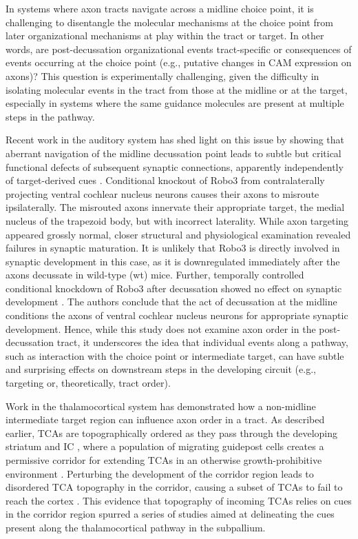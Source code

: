 In systems where axon tracts navigate across a midline choice point, it is challenging to disentangle the molecular mechanisms at the choice point from later organizational mechanisms at play within the tract or target. 
In other words, are post-decussation organizational events tract-specific or consequences of events occurring at the choice point (e.g., putative changes in CAM expression on axons)? 
This question is experimentally challenging, given the difficulty in isolating molecular events in the tract from those at the midline or at the target, especially in systems where the same guidance molecules are present at multiple steps in the pathway. 

Recent work in the auditory system has shed light on this issue by showing that aberrant navigation of the midline decussation point leads to subtle but critical functional defects of subsequent synaptic connections, apparently independently of target-derived cues \cite{michalski2013robo3}. 
Conditional knockout of Robo3 from contralaterally projecting ventral cochlear nucleus neurons causes their axons to misroute ipsilaterally. 
The misrouted axons innervate their appropriate target, the medial nucleus of the trapezoid body, but with incorrect laterality. 
While axon targeting appeared grossly normal, closer structural and physiological examination revealed failures in synaptic maturation. 
It is unlikely that Robo3 is directly involved in synaptic development in this case, as it is downregulated immediately after the axons decussate in wild-type (wt) mice. 
Further, temporally controlled conditional knockdown of Robo3 after decussation showed no effect on synaptic development \cite{michalski2013robo3}. 
The authors conclude that the act of decussation at the midline conditions the axons of ventral cochlear nucleus neurons for appropriate synaptic development. 
Hence, while this study does not examine axon order in the post-decussation tract, it underscores the idea that individual events along a pathway, such as interaction with the choice point or intermediate target, can have subtle and surprising effects on downstream steps in the developing circuit (e.g., targeting or, theoretically, tract order). 

Work in the thalamocortical system has demonstrated how a non-midline intermediate target region can influence axon order in a tract. 
As described earlier, TCAs are topographically ordered as they pass through the developing striatum and IC \cite{garel2014inputs}, where a population of migrating guidepost cells creates a permissive corridor for extending TCAs in an otherwise growth-prohibitive environment \cite{bielle2011emergent,lopez2006tangential}. 
Perturbing the development of the corridor region leads to disordered TCA topography in the corridor, causing a subset of TCAs to fail to reach the cortex \cite{garel2002early}. 
This evidence that topography of incoming TCAs relies on cues in the corridor region spurred a series of studies aimed at delineating the cues present along the thalamocortical pathway in the subpallium. 

